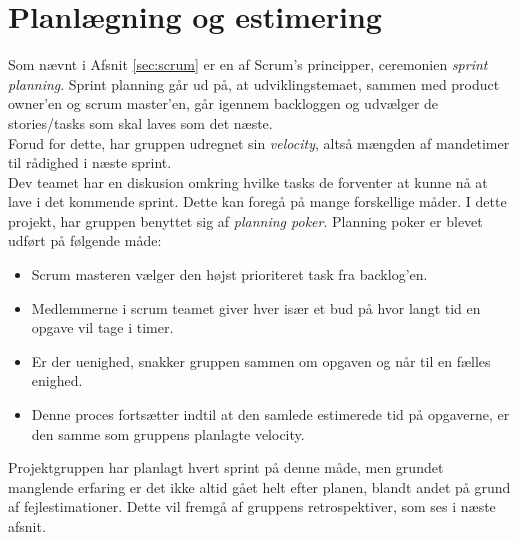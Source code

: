 \section{Planlægning og estimering}\label{sec:planning}
Som nævnt i Afsnit \ref{sec:scrum} er en af Scrum's principper, ceremonien \textit{sprint planning}.
Sprint planning går ud på, at udviklingstemaet, sammen med product owner'en og scrum master'en, går igennem
backloggen og udvælger de stories/tasks som skal laves som det næste. \\

Forud for dette, har gruppen udregnet sin 
\textit{velocity}, altså mængden af mandetimer til rådighed i næste sprint. \\

Dev teamet har en diskusion omkring hvilke tasks de forventer at kunne nå at lave i det kommende sprint. 
Dette kan foregå på mange forskellige måder.
I dette projekt, har gruppen benyttet sig af \textit{planning poker}. Planning poker er blevet udført på følgende måde:

\begin{itemize}
    \item Scrum masteren vælger den højst prioriteret task fra backlog'en.
    \item Medlemmerne i scrum teamet giver hver især et bud på hvor langt tid en opgave vil tage i timer.
    \item Er der uenighed, snakker gruppen sammen om opgaven og når til en fælles enighed.
    \item Denne proces fortsætter indtil at den samlede estimerede tid på opgaverne, er den samme som gruppens planlagte velocity.
\end{itemize}

Projektgruppen har planlagt hvert sprint på denne måde, men grundet manglende erfaring er det ikke altid gået helt efter planen, blandt andet på grund
af fejlestimationer. Dette vil fremgå af gruppens retrospektiver, som ses i næste afsnit.